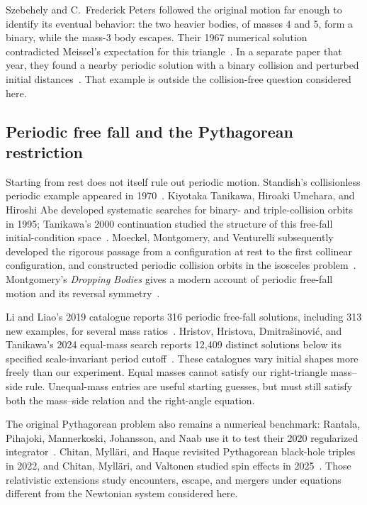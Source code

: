 Szebehely and C.~Frederick Peters followed the original motion far enough
to identify its eventual behavior: the two heavier bodies, of masses 4
and 5, form a binary, while the mass-3 body escapes. Their 1967 numerical
solution contradicted Meissel's expectation for this
triangle~\cite{SP1967}.
In a separate paper that year, they found a nearby periodic solution with
a binary collision and perturbed initial distances~\cite{SPPeriodic}.
That example is outside the collision-free question considered here.

\subsection{Periodic free fall and the Pythagorean restriction}

Starting from rest does not itself rule out periodic motion. Standish's
collisionless periodic example appeared in 1970~\cite{Standish1970}.
Kiyotaka Tanikawa, Hiroaki Umehara, and Hiroshi Abe developed systematic
searches for binary- and triple-collision orbits in 1995; Tanikawa's 2000
continuation studied the structure of this free-fall initial-condition
space~\cite{TUA,Tanikawa2000}.
Moeckel, Montgomery, and Venturelli subsequently developed the rigorous
passage from a configuration at rest to the first collinear configuration,
and constructed periodic collision orbits in the isosceles
problem~\cite{MMV}. Montgomery's \emph{Dropping Bodies} gives a modern
account of periodic free-fall motion and its reversal symmetry~\cite{Montgomery}.

Li and Liao's 2019 catalogue reports 316 periodic free-fall solutions, including
313 new examples, for several mass ratios~\cite{LiLiao}.
Hristov, Hristova, Dmitra\v sinovi\'c, and Tanikawa's 2024 equal-mass search
reports 12,409 distinct solutions below its specified scale-invariant
period cutoff~\cite{Hristov}. These catalogues vary initial shapes more
freely than our experiment. Equal masses cannot satisfy our right-triangle
mass--side rule. Unequal-mass entries are useful starting guesses, but must
still satisfy both the mass--side relation and the right-angle equation.

The original Pythagorean problem also remains a numerical benchmark:
Rantala, Pihajoki, Mannerkoski, Johansson, and Naab use it to test their
2020 regularized integrator~\cite{Rantala}. Chitan, Myll\"ari, and Haque
revisited Pythagorean black-hole triples in 2022, and Chitan, Myll\"ari,
and Valtonen studied spin effects in 2025~\cite{Chitan2022,Chitan2025}.
Those relativistic extensions study encounters, escape, and mergers under
equations different from the Newtonian system considered here.

